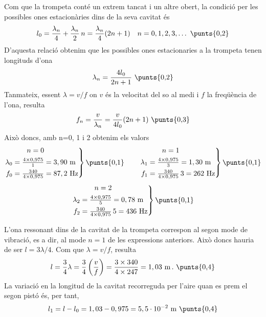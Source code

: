 \begin{solapartat}
Com que la trompeta conté un extrem tancat i un altre obert, la condició per les possibles ones estacionàries dins de la seva cavitat és
\[ l_0 = \frac{\lambda_n}{4} + \frac{\lambda_n}{2}\,n = \frac{\lambda_n}{4}(2n+1) \quad n = 0, 1, 2, 3, \ldots \ \text{\punts{0,2}} \]
D'aquesta relació obtenim que les possibles ones estacionaries a la trompeta tenen longituds d'ona
\[ \lambda_n = \frac{4l_0}{2n+1} \ \text{\punts{0,2}} \]
Tanmateix, essent $\lambda = v/f$ on $v$ és la velocitat del so al medi i $f$ la freqüència de l'ona, resulta
\[ f_n = \frac{v}{\lambda_n} = \frac{v}{4l_0}(2n+1) \ \text{\punts{0,3}} \]
Això doncs, amb n=0, 1 i 2 obtenim els valors
\[ \left.\begin{aligned} &\qquad n = 0\\ \lambda_0 &= \tfrac{4\times 0,975}{1} = 3,90\ \mathrm{m}\\ f_0 &= \tfrac{340}{4\times 0,975} = 87,2\ \mathrm{Hz}\end{aligned}\right\} \text{\punts{0,1}}
\qquad
\left.\begin{aligned} &\qquad n = 1\\ \lambda_1 &= \tfrac{4\times 0,975}{3} = 1,30\ \mathrm{m}\\ f_1 &= \tfrac{340}{4\times 0,975}\,3 = 262\ \mathrm{Hz}\end{aligned}\right\} \text{\punts{0,1}} \]
\[ \left.\begin{aligned} &\qquad n = 2\\ \lambda_2 &= \tfrac{4\times 0,975}{5} = 0,78\ \mathrm{m}\\ f_2 &= \tfrac{340}{4\times 0,975}\,5 = 436\ \mathrm{Hz}\end{aligned}\right\} \text{\punts{0,1}} \]
\end{solapartat}

\begin{solapartat}
L'ona ressonant dins de la cavitat de la trompeta correspon al segon mode de vibració, es a dir, al mode $n = 1$  de les expressions anteriors. Això doncs hauria de ser $l = 3\lambda/4$. Com que $\lambda = v/f$, resulta
\[ l = \frac{3}{4}\lambda = \frac{3}{4}\left(\frac{v}{f}\right) = \frac{3\times 340}{4\times 247} = 1,03\ \mathrm{m}\,. \ \text{\punts{0,4}} \]
La variació en la longitud de la cavitat recorreguda per l'aire quan es prem el segon pistó és, per tant,
\[ l_1 = l - l_0 = 1,03 - 0,975 = 5,5\cdot 10^{-2}\ \mathrm{m} \ \text{\punts{0,4}} \]
\end{solapartat}
